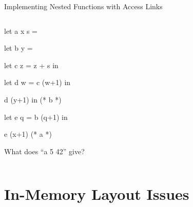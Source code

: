 \documentclass{plt}
\begin{document}
\begin{frame}[fragile]{Implementing Nested Functions with Access Links}

\begin{columns}
  \begin{column}{0.5\textwidth}
\begin{ocaml}
let a x s =

  let b y =

    let c z = z + s in

    let d w = c (w+1) in

    d (y+1) in (* b *)

  let e q = b (q+1) in

e (x+1) (* a *)
\end{ocaml}

What does ``a 5 42'' give?


  \end{column}
  \begin{column}{0.5\textwidth}
      \begin{overlayarea}{\textwidth}{0.8\textheight}
      \end{overlayarea}
  \end{column}
\end{columns}
\end{frame}

\part{In-Memory Layout Issues}
\frame{\partpage}
\end{document}
